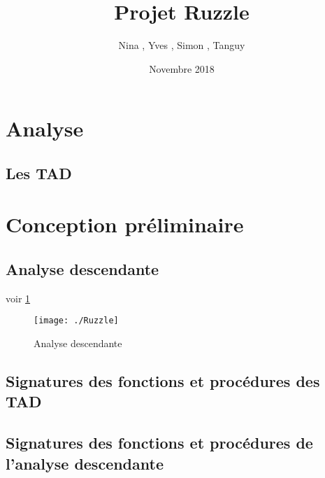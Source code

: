 \documentclass[a4paper]{article}
\title{Projet Ruzzle}
\author{Nina \noun{Lardière}, Yves \noun{Le Guennec}, Simon \noun{Lebeaud}, Tanguy \noun{Leclerc}}
\date{Novembre 2018}
\begin{document}
	\maketitle
	\section{Analyse}
		\subsection{Les TAD}
		

 \section{Conception préliminaire}
		\subsection{Analyse descendante}
			voir \ref{fig:AD}
			\begin{figure}
				\centering \texttt{[image: ./Ruzzle]} %
				\caption{\label{fig:AD}Analyse descendante}
			\end{figure}

		\subsection{Signatures des fonctions et procédures des TAD}
		
		
		
		
	\subsection{Signatures des fonctions et procédures de l'analyse descendante}
\end{document}
